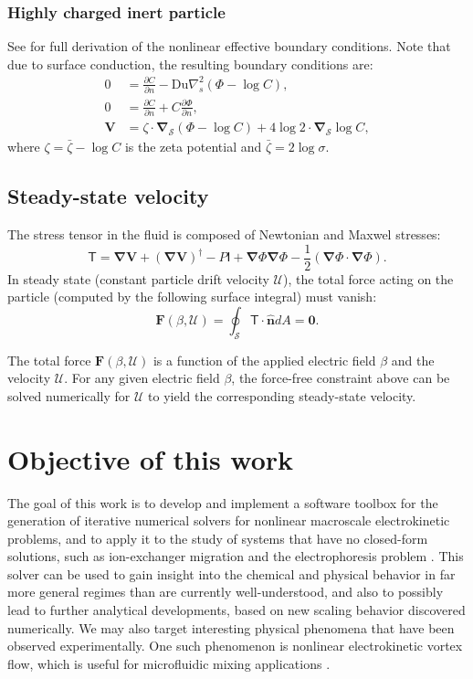 \documentclass[MSc,beforeExam]{iitcsthesis}
\newcommand{\deriv}[2]{\frac{\partial #1}{\partial #2}}
\newcommand{\pars}[1]{\left(#1\right)}
\newcommand\bnabla{\boldsymbol{\nabla}}
\newcommand\bV{\boldsymbol{V}}
\newcommand\bF{\boldsymbol{F}}
\newcommand\bnhat{\hat{\boldsymbol{n}}}
\newcommand\bzero{\boldsymbol{0}}
\newcommand\cU{\mathscr{U}}
\newcommand\tI{\mathsf{I}}
\newcommand\tT{\mathsf{T}}
\begin{document}
\subsubsection{Highly charged inert particle}
See \cite{schnitzer2012surface} for full derivation
of the nonlinear effective boundary conditions. 
Note that due to surface conduction, the resulting boundary conditions are:
\begin{align} \label{eq:ephor_bnd}
\nonumber
0 &= {\deriv{C}{n} - \text{Du} \nabla^2_s \pars{\varPhi - \log C}}, \\
0 &= {\deriv{C}{n} + C \deriv{\varPhi}{n}}, \\
\nonumber
\bV &= \zeta \cdot \bnabla_\mathcal{S} \pars{\varPhi - \log C} +
4 \log 2 \cdot \bnabla_\mathcal{S} \log C,
\end{align}
where $\zeta = \bar{\zeta} - \log C$ 
is the zeta potential and $\bar{\zeta} = 2 \log \sigma$.

\subsection{Steady-state velocity}
The stress tensor in the fluid is composed of Newtonian and Maxwel stresses:
\begin{equation}
\label{eq:tensor}
\tT = \bnabla \bV + (\bnabla \bV)^\dagger - P \tI
+ \bnabla \varPhi \bnabla \varPhi - \frac{1}{2} (\bnabla \varPhi \cdot \bnabla \varPhi). 
\end{equation} 
In steady state (constant particle drift velocity $\cU$), the total force acting on the particle 
(computed by the following surface integral) must vanish:
\begin{equation} \label{eq:zero_force}
 \bF(\beta, \cU) = \oint_\mathcal{S} \tT \cdot \bnhat dA = \bzero.
\end{equation}

The total force $\bF(\beta, \cU)$ is a function of the applied electric field $\beta$ and
the velocity $\cU$.
For any given electric field $\beta$, the force-free constraint above 
can be solved numerically for $\cU$ to yield the corresponding steady-state velocity.

\section{Objective of this work}

The goal of this work is to develop and implement a software toolbox 
for the generation of iterative numerical solvers for nonlinear macroscale 
electrokinetic problems, and to apply it to the study
of systems that have no closed-form solutions, 
such as ion-exchanger migration \cite{yariv2010migration} 
and the electrophoresis problem \cite{schnitzer2012surface}.
This solver can be used to gain insight into the chemical 
and physical behavior in far more general regimes than 
are currently well-understood, 
and also to possibly lead to further analytical developments, 
based on new scaling behavior
discovered numerically. 
We may also target interesting physical
phenomena that have been observed experimentally.
One such phenomenon is nonlinear electrokinetic vortex flow, 
which is useful for microfluidic mixing applications 
\cite{wang2004mix, ben2002vortex}.
\end{document}
